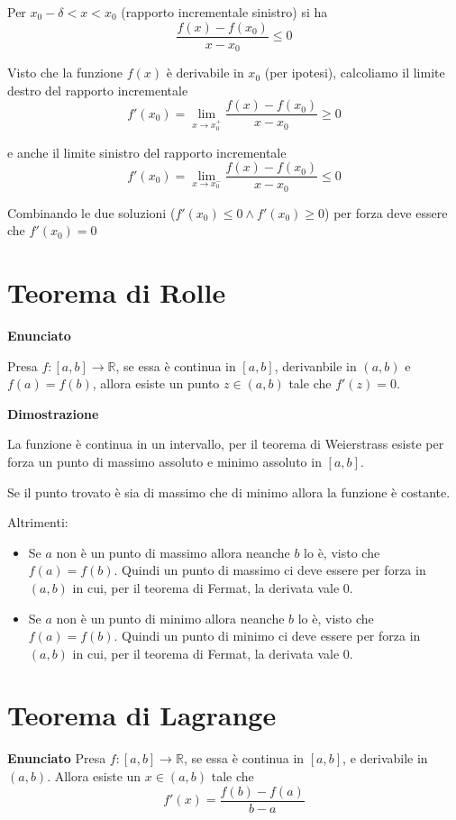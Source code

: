 Per $x_0-\delta<x<x_0$ (rapporto incrementale sinistro) si ha $$ \frac{f(x)-f(x_0)}{x-x_0} \leq 0$$

Visto che la funzione $f(x)$ è derivabile in $x_0$ (per ipotesi), calcoliamo il limite destro del rapporto incrementale $$f'(x_0) = \lim_{x\to x^+_0}\frac{f(x)-f(x_0)}{x-x_0} \geq 0$$

e anche il limite sinistro del rapporto incrementale $$f'(x_0) = \lim_{x\to x^-_0}\frac{f(x)-f(x_0)}{x-x_0} \leq 0$$

Combinando le due soluzioni ($f'(x_0)\leq 0 \land f'(x_0)\geq 0$) per forza deve essere che $f'(x_0)=0$


\section{Teorema di Rolle}

\textbf{Enunciato}

Presa $f: [a,b] \to \mathbb{R}$, se essa è continua in $[a,b]$, derivanbile in $(a,b)$ e $f(a)=f(b)$, allora esiste un punto $z \in (a,b)$ tale che $f'(z)=0$.

\textbf{Dimostrazione}

La funzione è continua in un intervallo, per il teorema di Weierstrass esiste per forza un punto di massimo assoluto e minimo assoluto in $[a,b]$.   

Se il punto trovato è sia di massimo che di minimo allora la funzione è costante.

Altrimenti:

\begin{itemize}
\item Se $a$ non è un punto di massimo allora neanche $b$ lo è, visto che $f(a)=f(b)$. Quindi un punto di massimo ci deve essere per forza in $(a,b)$ in cui, per il teorema di Fermat, la derivata vale 0.

\item Se $a$ non è un punto di minimo allora neanche $b$ lo è, visto che $f(a)=f(b)$. Quindi un punto di minimo ci deve essere per forza in $(a,b)$ in cui, per il teorema di Fermat, la derivata vale 0.
\end{itemize}


\section{Teorema di Lagrange}

\textbf{Enunciato}
Presa $f: [a,b] \to \mathbb{R}$, se essa è continua in $[a,b]$, e derivabile in $(a,b)$. Allora esiste un $x \in (a,b)$ tale che $$f'(x)=\frac{f(b)-f(a)}{b-a}$$


